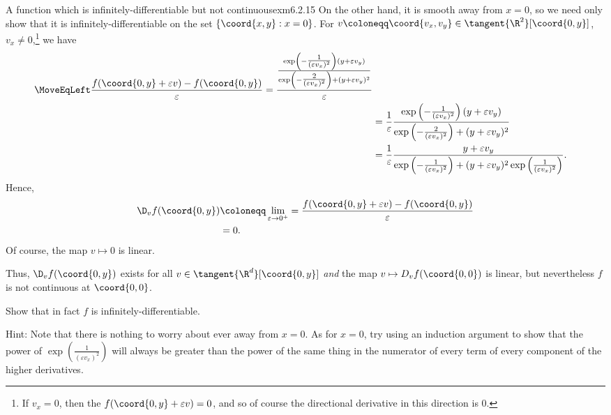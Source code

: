 \begin{exm}{A function which is infinitely-diff\-er\-en\-tia\-ble but not continuous}{exm6.2.15}
On the other hand, it is smooth away from $x=0$, so we need only show that it is infinitely-differentiable on the set $\{ \coord{x,y}:x=0\}$.  For $v\coloneqq \coord{v_x,v_y}\in \tangent{\R ^2}[\coord{0,y}]$, $v_x\neq 0$,\footnote{If $v_x=0$, then the $f(\coord{0,y}+\varepsilon v)=0$, and so of course the directional derivative in this direction is $0$.} we have
\begin{equation}
\begin{split}
\MoveEqLeft
\frac{f(\coord{0,y}+\varepsilon v)-f(\coord{0,y})}{\varepsilon}=\frac{\frac{\exp \left( -\tfrac{1}{(\varepsilon v_x)^2}\right) (y+\varepsilon v_y)}{\exp \left(-\tfrac{2}{(\varepsilon v_x)^2}\right) +(y+\varepsilon v_y)^2}}{\varepsilon} \\
& =\frac{1}{\varepsilon}\frac{\exp \left( -\tfrac{1}{(\varepsilon v_x)^2}\right) (y+\varepsilon v_y)}{\exp \left( -\tfrac{2}{(\varepsilon v_x)^2}\right) +(y+\varepsilon v_y)^2} \\
& =\frac{1}{\varepsilon}\frac{y+\varepsilon v_y}{\exp \left( -\tfrac{1}{(\varepsilon v_x)^2}\right) +(y+\varepsilon v_y)^2\exp \left( \tfrac{1}{(\varepsilon v_x)^2}\right) }.
\end{split}
\end{equation}
Hence,
\begin{equation}
\begin{split}
\D _vf(\coord{0,y}) & \coloneqq \lim _{\varepsilon \to 0^+}=\frac{f(\coord{0,y}+\varepsilon v)-f(\coord{0,y})}{\varepsilon} \\
& =0.
\end{split}
\end{equation}
Of course, the map $v\mapsto 0$ is linear.

Thus, $\D _vf(\coord{0,y})$ exists for all $v\in \tangent{\R ^d}[\coord{0,y}]$ \emph{and} the map $v\mapsto D _vf(\coord{0,0})$ is linear, but nevertheless $f$ is not continuous at $\coord{0,0}$.

\begin{exr}[breakable=false]{}{}
Show that in fact $f$ is infinitely-differentiable.
\begin{rmk}
Hint:  Note that there is nothing to worry about ever away from $x=0$.  As for $x=0$, try using an induction argument to show that the power of $\exp \left( \tfrac{1}{(\varepsilon v_x)^2}\right)$ will always be greater than the power of the same thing in the numerator of every term of every component of the higher derivatives.
\end{rmk}
\end{exr}
\end{exm}
